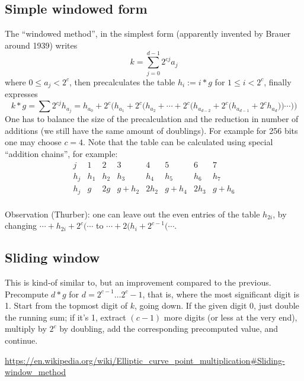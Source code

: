 \documentclass[12pt,draft,a4paper,openany,oneside]{amsbook}
\theoremstyle{plain}
\theoremstyle{definition}
\begin{document}
\subsection{Simple windowed form}
The ``windowed method'', in the simplest form (apparently invented by Brauer around 1939)
writes 
\[ k = \sum_{j=0}^{d-1} 2^{cj} a_j \]
where $0\le a_j < 2^c$, then precalculates the table $h_{i}:=i*g$ for
$1\le i < 2^c$, finally expresses
\[ k*g = \sum 2^{cj} h_{a_j} = h_{a_0} + 2^c\Big( h_{a_1} + 2^c\Big(h_{a_2} + \cdots + 2^c\Big( h_{a_{d-2}} + 2^c\Big(h_{a_{d-1}} + 2^c h_{a_d} \Big)\Big)\cdots \Big)\Big) \]
One has to balance the size of the precalculation and the reduction in number of additions
(we still have the same amount of doublings). For example for 256 bits one may choose
$c=4$. Note that the table can be calculated using special ``addition chains'',
for example:
\[\begin{array}{c|ccccccc}
j   &   1 &   2 &   3 &   4 &   5 &   6 &   7 \\ \hline
h_j & h_1 & h_2 & h_3 & h_4 & h_5 & h_6 & h_7 \\
h_j & g & 2g & g+h_2 & 2h_2 & g+h_4 & 2h_3 & g+h_6\\
\end{array}
\]

Observation (Thurber): one can leave out the even entries of the table $h_{2i}$,
by changing $\cdots+h_{2i}+2^c(\cdots$ to $\cdots+2(h_{i}+2^{c-1}(\cdots$.


\subsection{Sliding window}
This is kind-of similar to, but an improvement compared to the previous.
Precompute $d*g$ for $d=2^{c-1}\dots 2^c-1$, that is, where the most significant digit is 1.
Start from the topmost digit of $k$, going down. If the given digit 0, just double
the running sum; if it's 1, extract $(c-1)$ more digits (or less at the very end),
multiply by $2^c$ by doubling, add the corresponding precomputed value, and continue.

\url{https://en.wikipedia.org/wiki/Elliptic_curve_point_multiplication#Sliding-window_method}

\end{document}
